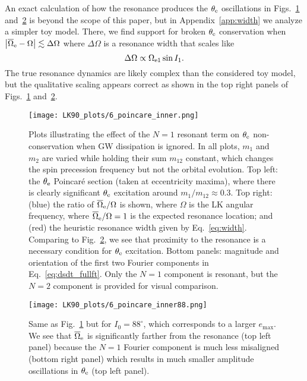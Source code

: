 \documentclass[
        twocolumn,
        twocolappendix
    ]{aastex63}
\newcommand*{\abs}[1]{\left|#1\right|}
\begin{document}
An exact calculation of how the resonance produces the $\theta_{\rm e}$
oscillations in Figs.~\ref{fig:poincare1} and~\ref{fig:poincare2} is beyond the scope of this paper, but
in Appendix~\ref{app:width} we analyze a simpler toy model. There, we find
support for broken $\theta_{\rm e}$ conservation when
$\abs{\overline{\Omega}_{\rm e} - \Omega} \lesssim \Delta \Omega$ where $\Delta
\Omega$ is a resonance width that scales like
\begin{equation}
    \Delta \Omega \propto \Omega_{\rm e1}\sin I_1.\label{eq:width}
\end{equation}
The true resonance dynamics are likely complex than the considered toy model,
but the qualitative scaling appears correct as shown in the top right panels of
Figs.~\ref{fig:poincare1} and~\ref{fig:poincare2}.
\begin{figure}
    \centering
    \texttt{[image: LK90\_plots/6\_poincare\_inner.png]}
    \caption{Plots illustrating the effect of the $N = 1$ resonant term on
    $\theta_{\rm e}$ non-conservation when GW dissipation is ignored. In all
    plots, $m_1$ and $m_2$ are varied while holding their sum $m_{12}$ constant,
    which changes the spin precession frequency but not the orbital evolution.
    Top left: the $\theta_{\rm e}$ Poincar\'e section (taken at eccentricity
    maxima), where there is clearly significant $\theta_{\rm e}$ excitation
    around $m_1 / m_{12} \approx 0.3$. Top right: (blue) the ratio of
    $\overline{\Omega}_{\rm e} / \Omega$ is shown, where $\Omega$ is the LK
    angular frequency, where $\overline{\Omega}_{\rm e} / \Omega = 1$ is the
    expected resonance location; and (red) the heuristic resonance width given
    by Eq.~\eqref{eq:width}. Comparing to Fig.~\ref{fig:poincare2}, we see that
    proximity to the resonance is a necessary condition for $\theta_{\rm e}$
    excitation. Bottom panels: magnitude and orientation of the first two
    Fourier components in Eq.~\eqref{eq:dsdt_fullft}. Only the $N = 1$ component
    is resonant, but the $N = 2$ component is provided for visual comparison.
    }\label{fig:poincare1}
\end{figure}
\begin{figure}
    \centering
    \texttt{[image: LK90\_plots/6\_poincare\_inner88.png]}
    \caption{Same as Fig.~\ref{fig:poincare1} but for $I_0 = 88^\circ$, which
    corresponds to a larger $e_{\max}$. We see that
    $\overline{\Omega}_{\rm e}$ is significantly farther from the resonance (top
    left panel) because the $N = 1$ Fourier component is much less misaligned
    (bottom right panel) which results in much smaller amplitude oscillations in
    $\theta_{\rm e}$ (top left panel).}\label{fig:poincare2}
\end{figure}
\end{document}
